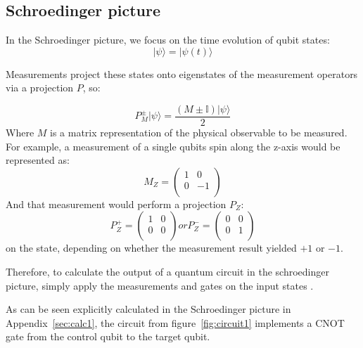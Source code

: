 \subsection{Schroedinger picture}
In the Schroedinger picture, we focus on the time evolution of qubit states:
\begin{equation}  
	|\psi\rangle = |\psi(t)\rangle 
\end{equation}

Measurements project these states onto eigenstates of the measurement operators via
a projection $P$, so:

\begin{equation}
    P_M^{\pm} |\psi\rangle = \frac{(M\pm \mathbb{I})|\psi\rangle}{2}
\end{equation}
Where $M$ is a matrix representation of the physical observable
 to be measured.
For example, a measurement of a single qubits spin along the z-axis would be
represented as:
\begin{equation}
    M_Z = \left(
        \begin{array}{cc}
            1 & 0 \\
            0 & -1 \\
        \end{array}
        \right)
\end{equation}
And that measurement would perform a projection $P_Z$:
\begin{equation}
    P_Z^+ = \left(
        \begin{array}{cc}
            1 & 0 \\
            0 & 0 \\
        \end{array}
        \right)
    or
    P_Z^- = \left(
        \begin{array}{cc}
            0 & 0 \\
            0 & 1 \\
        \end{array}
        \right)
\end{equation}
on the state, depending on whether the measurement result yielded $+1$ or $-1$.

Therefore, to calculate the output of a quantum circuit in the schroedinger
picture, simply apply the measurements and gates on the input states
.

As can be seen explicitly calculated in the Schroedinger 
picture in Appendix~\ref{sec:calc1}, the circuit from figure~\ref{fig:circuit1}
implements a CNOT gate from the control qubit to the target qubit.

